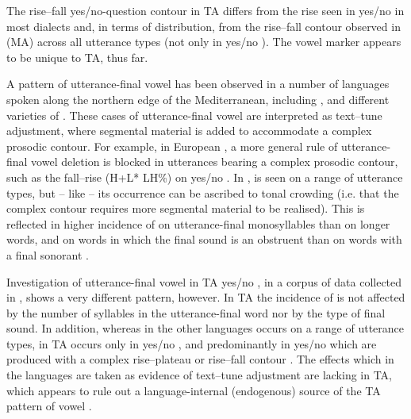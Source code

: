 \documentclass[output=paper]{langsci/langscibook}
\begin{document}
The rise--fall yes/no-question contour in TA differs from the rise seen in yes/no  in most  dialects \citep{Hellmuthtoappearbook} and, in terms of distribution, from the rise--fall contour observed in   (MA) across all utterance types (not only in yes/no ). The vowel  marker appears to be unique to TA, thus far.

A pattern of utterance-final vowel  has been observed in a number of  languages spoken along the northern edge of the Mediterranean, including   \citep{GriceEtAl2015}, and different varieties of  \citep{FrotaEtAl2015}. These cases of utterance-final vowel  are interpreted as text--tune adjustment, where segmental material is added to accommodate a complex prosodic contour.  For example, in  European , a more general rule of utterance-final vowel deletion is blocked in utterances bearing a complex prosodic contour, such as the fall--rise (H+L* LH\%) on yes/no  \citep{FrotaEtAl2015}. In  ,  is seen on a range of utterance types, but – like  – its occurrence can be ascribed to tonal crowding (i.e. that the complex contour requires more segmental material to be realised). This is reflected in higher incidence of  on utterance-final monosyllables than on longer words, and on words in which the final sound is an obstruent than on words with a final sonorant \citep{GriceEtAl2015}.

Investigation of utterance-final vowel  in TA yes/no , in a corpus of data collected in , shows a very different pattern, however. In TA the incidence of  is not affected by the number of syllables in the utterance-final word nor by the type of final sound. In addition, whereas in the other  languages  occurs on a range of utterance types, in TA  occurs only in yes/no , and predominantly in yes/no  which are produced with a complex rise--plateau or rise--fall contour \citep{Hellmuthforthcomingtunisianyesno}. The effects which in the  languages are taken as evidence of text--tune adjustment are lacking in TA, which appears to rule out a language-internal (endogenous) source of the TA pattern of vowel .
\end{document}
